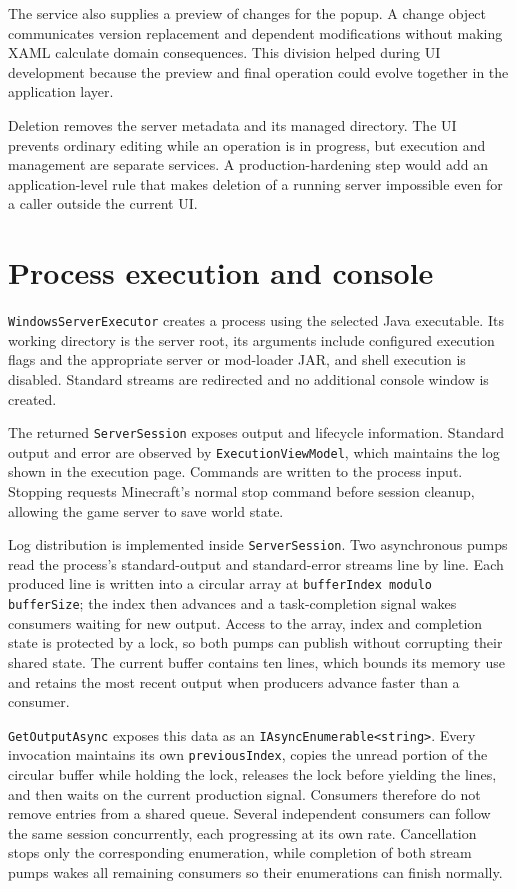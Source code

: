 The service also supplies a preview of changes for the popup. A change object communicates version replacement and dependent modifications without making XAML calculate domain consequences. This division helped during UI development because the preview and final operation could evolve together in the application layer.

Deletion removes the server metadata and its managed directory. The UI prevents ordinary editing while an operation is in progress, but execution and management are separate services. A production-hardening step would add an application-level rule that makes deletion of a running server impossible even for a caller outside the current UI.

\section{Process execution and console}

\texttt{WindowsServerExecutor} creates a process using the selected Java executable. Its working directory is the server root, its arguments include configured execution flags and the appropriate server or mod-loader JAR, and shell execution is disabled. Standard streams are redirected and no additional console window is created.

The returned \texttt{ServerSession} exposes output and lifecycle information. Standard output and error are observed by \texttt{ExecutionViewModel}, which maintains the log shown in the execution page. Commands are written to the process input. Stopping requests Minecraft's normal stop command before session cleanup, allowing the game server to save world state.

Log distribution is implemented inside \texttt{ServerSession}. Two asynchronous pumps read the process's standard-output and standard-error streams line by line. Each produced line is written into a circular array at \texttt{bufferIndex modulo bufferSize}; the index then advances and a task-completion signal wakes consumers waiting for new output. Access to the array, index and completion state is protected by a lock, so both pumps can publish without corrupting their shared state. The current buffer contains ten lines, which bounds its memory use and retains the most recent output when producers advance faster than a consumer.

\texttt{GetOutputAsync} exposes this data as an \texttt{IAsyncEnumerable<string>}. Every invocation maintains its own \texttt{previousIndex}, copies the unread portion of the circular buffer while holding the lock, releases the lock before yielding the lines, and then waits on the current production signal. Consumers therefore do not remove entries from a shared queue. Several independent consumers can follow the same session concurrently, each progressing at its own rate. Cancellation stops only the corresponding enumeration, while completion of both stream pumps wakes all remaining consumers so their enumerations can finish normally.

